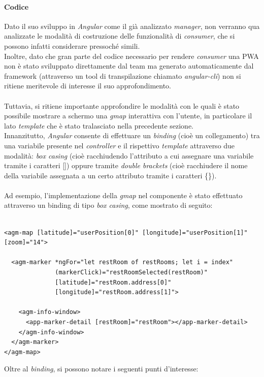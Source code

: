 \documentclass[12pt]{article}
\begin{document}
\paragraph{Codice}
Dato il suo sviluppo in \textit{Angular} come il già analizzato \textit{manager}, non verranno qua analizzate le modalità di costruzione delle funzionalità di \textit{consumer}, che si possono infatti considerare pressoché simili.\\
Inoltre, dato che gran parte del codice necessario per rendere \textit{consumer} una PWA non è stato sviluppato direttamente dal team ma generato automaticamente dal framework (attraverso un tool di transpilazione chiamato \textit{angular-cli}) non si ritiene meritevole di interesse il suo approfondimento.\\\\
Tuttavia, si ritiene importante approfondire le modalità con le quali è stato possibile mostrare a schermo una \textit{gmap} interattiva con l'utente, in particolare il lato \textit{template} che è stato tralasciato nella precedente sezione.\\
Innanzitutto, \textit{Angular} consente di effettuare un \textit{binding} (cioè un collegamento) tra una variabile presente nel \textit{controller} e il rispettivo \textit{template} attraverso due modalità: \textit{box casing} (cioè racchiudendo l'attributo a cui assegnare una variabile tramite i caratteri []) oppure tramite \textit{double brackets} (cioè racchiudere il nome della variabile assegnata a un certo attributo tramite i caratteri \{\}).\\\\
Ad esempio, l'implementazione della \textit{gmap} nel componente è stato effettuato attraverso un binding di tipo \textit{box casing}, come mostrato di seguito: 
\begin{lstlisting}[style=htmlcssjs]

<agm-map [latitude]="userPosition[0]" [longitude]="userPosition[1]"
[zoom]="14">

  <agm-marker *ngFor="let restRoom of restRooms; let i = index"
              (markerClick)="restRoomSelected(restRoom)"
              [latitude]="restRoom.address[0]"
              [longitude]="restRoom.address[1]">

    <agm-info-window>
      <app-marker-detail [restRoom]="restRoom"></app-marker-detail>
    </agm-info-window>
  </agm-marker>
</agm-map>
\end{lstlisting}
\newpage
Oltre al \textit{binding}, si possono notare i seguenti punti d'interesse:
\end{document}
